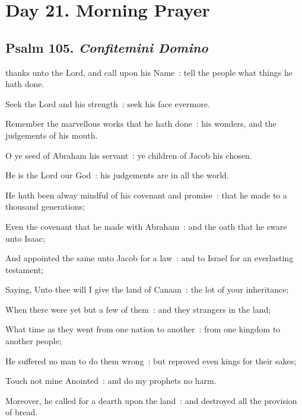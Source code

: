 \section*{Day 21. Morning Prayer}

\subsection{Psalm 105. \textit{Confitemini Domino}}

 thanks unto the Lord, and call upon his Name~: tell the people what things he hath done.\par
{}
Seek the Lord and his strength~: seek his face evermore.\par
{}Remember the marvellous works that he hath done~: his wonders, and the judgements of his mouth.\par
{}O ye seed of Abraham his servant~: ye children of Jacob his chosen.\par
{}He is the Lord our God~: his judgements are in all the world.\par
{}He hath been alway mindful of his covenant and promise~: that he made to a thousand generations;\par
{}Even the covenant that he made with Abraham~: and the oath that he sware unto Isaac;\par
{}And appointed the same unto Jacob for a law~: and to Israel for an everlasting testament;\par
{}Saying, Unto thee will I give the land of Canaan~: the lot of your inheritance;\par
{}When there were yet but a few of them~: and they strangers in the land;\par
{}What time as they went from one nation to another~: from one kingdom to another people;\par
{}He suffered no man to do them wrong~: but reproved even kings for their sakes;\par
{}Touch not mine Anointed~: and do my prophets no harm.\par
{}Moreover, he called for a dearth upon the land~: and destroyed all the provision of bread.\par
